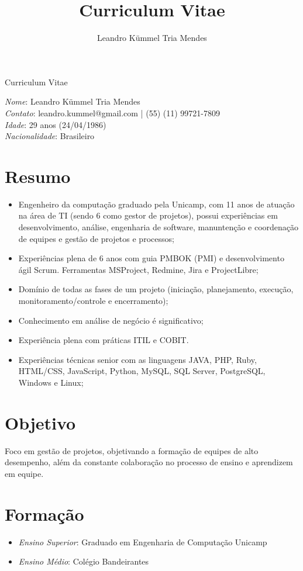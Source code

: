 \documentclass[a4paper,10pt]{article}
\title{Curriculum Vitae}
\author{Leandro Kümmel Tria Mendes}
\begin{document}
\begin{center} 
Curriculum Vitae
\end{center} 
\emph{Nome}: Leandro Kümmel Tria Mendes\\
\emph{Contato}: leandro.kummel@gmail.com | (55) (11) 99721-7809\\
\emph{Idade}: 29 anos (24/04/1986)\\
\emph{Nacionalidade}: Brasileiro\\
\section{Resumo}
\begin{itemize}
\item Engenheiro da computação graduado pela Unicamp, com 11 anos de atuação na área de TI (sendo 6 como gestor de projetos), possui experiências em desenvolvimento, análise, engenharia de software, manuntenção e coordenação de equipes e gestão de projetos e processos;
\item Experiências plena de 6 anos com guia PMBOK (PMI) e desenvolvimento ágil Scrum. Ferramentas MSProject, Redmine, Jira e ProjectLibre;
\item Domínio de todas as fases de um projeto (iniciação, planejamento, execução, monitoramento/controle e encerramento);
\item Conhecimento em análise de negócio é significativo;
\item Experiência plena com práticas ITIL e COBIT.
\item Experiências técnicas senior com as linguagens JAVA, PHP, Ruby, HTML/CSS, JavaScript, Python, MySQL, SQL Server, PostgreSQL, Windows e Linux;
\end{itemize}
\section{Objetivo}

  Foco em gestão de projetos, objetivando a formação de equipes de alto desempenho, além da constante colaboração no processo de ensino e aprendizem em equipe. 
\section{Formação}
\begin{itemize}
\item \emph{Ensino Superior}: Graduado em Engenharia de Computação Unicamp 
\item \emph{Ensino Médio}: Colégio Bandeirantes

\end{itemize}
\end{document}
